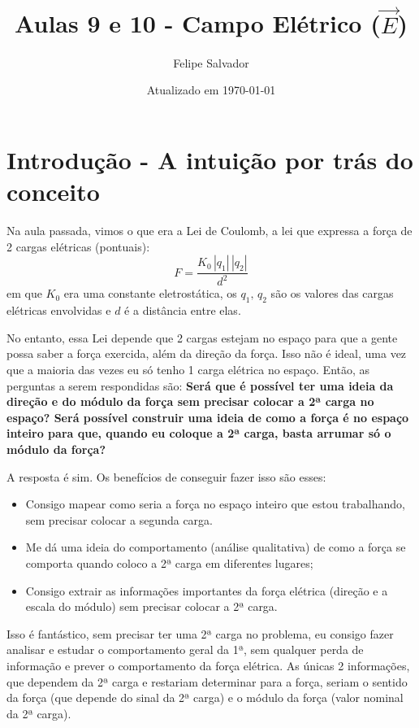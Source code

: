 \documentclass[12pt]{extarticle}
\title{Aulas 9 e 10 - Campo Elétrico ($\vec{E}$)}
\author{Felipe Salvador}
\date{Atualizado em \today}
\newcommand{\<}{\langle}
\renewcommand{\>}{\rangle}
\theoremstyle{definition}
\begin{document}
\maketitle

\section{Introdução - A intuição por trás do conceito}

Na aula passada, vimos o que era a Lei de Coulomb, a lei que expressa a força de 2 cargas elétricas (pontuais):
\begin{equation}
    F = \frac{K_0\,|q_1|\,|q_2|}{d^2}
\end{equation}
\noindent em que $K_0$ era uma constante eletrostática, os $q_1,\,q_2$ são os valores das cargas elétricas envolvidas e $d$ é a distância entre elas.

No entanto, essa Lei depende que 2 cargas estejam no espaço para que a gente possa saber a força exercida, além da direção da força. Isso não é ideal, uma vez que a maioria das vezes eu só tenho 1 carga elétrica no espaço. Então, as perguntas a serem respondidas são: \textbf{Será que é possível ter uma ideia da direção e do módulo da força sem precisar colocar a 2ª carga no espaço? Será possível construir uma ideia de como a força é no espaço inteiro para que, quando eu coloque a 2ª carga, basta arrumar só o módulo da força?}

A resposta é sim. Os benefícios de conseguir fazer isso são esses:
\begin{itemize}
    \item Consigo mapear como seria a força no espaço inteiro que estou trabalhando, sem precisar colocar a segunda carga.
    \item Me dá uma ideia do comportamento (análise qualitativa) de como a força se comporta quando coloco a 2ª carga em diferentes lugares;
    \item Consigo extrair as informações importantes da força elétrica (direção e a escala do módulo) sem precisar colocar a 2ª carga.
\end{itemize}

Isso é fantástico, sem precisar ter uma 2ª carga no problema, eu consigo fazer analisar e estudar o comportamento geral da 1ª, sem qualquer perda de informação e prever o comportamento da força elétrica. As únicas 2 informações, que dependem da 2ª carga e restariam determinar para a força, seriam o sentido da força (que depende do sinal da 2ª carga) e o módulo da força (valor nominal da 2ª carga). 
\end{document}
